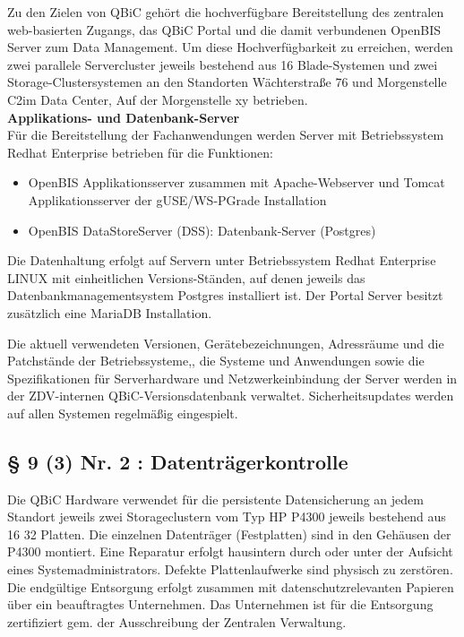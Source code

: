 \documentclass[]{scrreprt}
\begin{document}
Zu den Zielen von QBiC gehört die hochverfügbare Bereitstellung des zentralen web-basierten Zugangs, das QBiC Portal und die damit verbundenen OpenBIS Server zum Data Management. Um diese Hochverfügbarkeit zu erreichen, werden zwei parallele Servercluster jeweils bestehend aus 16 Blade-Systemen und zwei Storage-Clustersystemen an den Standorten Wächterstraße 76 und Morgenstelle C2im Data Center, Auf der Morgenstelle xy betrieben.\\
\newline
\noindent
\textbf{Applikations- und Datenbank-Server}\\
Für die Bereitstellung der Fachanwendungen werden Server mit Betriebssystem Redhat Enterprise betrieben für die Funktionen:

\begin{itemize}
	\item OpenBIS Applikationsserver zusammen mit Apache-Webserver und Tomcat Applikationsserver der gUSE/WS-PGrade Installation
	\item OpenBIS DataStoreServer (DSS): Datenbank-Server (Postgres)
\end{itemize}

Die Datenhaltung erfolgt auf Servern unter Betriebssystem Redhat Enterprise LINUX  mit einheitlichen Versions-Ständen, auf denen jeweils das Datenbankmanagementsystem Postgres installiert ist. Der Portal Server besitzt zusätzlich eine MariaDB Installation.

Die aktuell verwendeten Versionen, Gerätebezeichnungen, Adressräume und die Patchstände der Betriebssysteme,, die  Systeme und Anwendungen sowie die Spezifikationen für Serverhardware und Netzwerkeinbindung der Server werden in der ZDV-internen QBiC-Versionsdatenbank verwaltet. Sicherheitsupdates werden auf allen Systemen regelmäßig eingespielt.

\subsection{§ 9 (3) Nr. 2 : Datenträgerkontrolle}
Die QBiC Hardware verwendet für die persistente Datensicherung an jedem Standort jeweils zwei Storageclustern vom Typ HP P4300 jeweils bestehend aus 16 32 Platten. Die einzelnen Datenträger (Festplatten) sind in den Gehäusen der P4300 montiert. Eine Reparatur erfolgt hausintern durch oder unter der Aufsicht eines Systemadministrators. Defekte Plattenlaufwerke sind physisch zu zerstören. Die endgültige Entsorgung erfolgt zusammen mit datenschutzrelevanten Papieren über ein beauftragtes Unternehmen. Das Unternehmen ist für die Entsorgung zertifiziert gem. der Ausschreibung der Zentralen Verwaltung.
\end{document}
